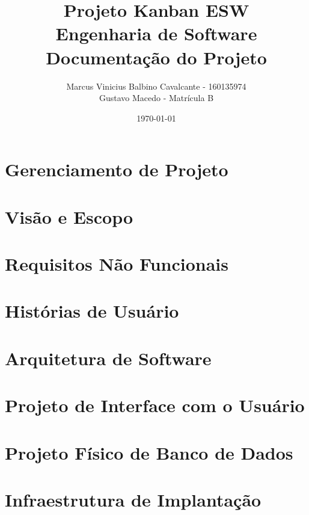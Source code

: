 \documentclass[12pt,a4paper]{report}
\title{
	\vspace{2cm}
	\textbf{Projeto Kanban ESW}\\
	\large Engenharia de Software\\
	\vspace{1cm}
	\textbf{Documentação do Projeto}
}
\author{
	Marcus Vinicius Balbino Cavalcante - 160135974\\
	Gustavo Macedo - Matrícula B \\
}
\date{\today}
\begin{document}
\maketitle

\tableofcontents
\newpage

\chapter{Gerenciamento de Projeto}


\chapter{Visão e Escopo}


\chapter{Requisitos Não Funcionais}


\chapter{Histórias de Usuário}


\chapter{Arquitetura de Software}


\chapter{Projeto de Interface com o Usuário}


\chapter{Projeto Físico de Banco de Dados}


\chapter{Infraestrutura de Implantação}

\end{document}
